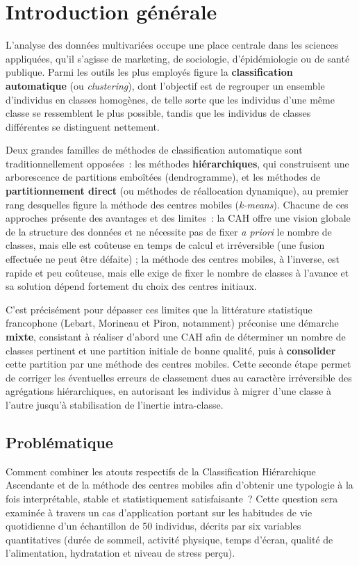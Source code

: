 \documentclass[11pt,a4paper,oneside]{book}
\begin{document}
\mainmatter

\chapter{Introduction générale}

L'analyse des données multivariées occupe une place centrale dans les sciences appliquées, qu'il s'agisse de marketing, de sociologie, d'épidémiologie ou de santé publique. Parmi les outils les plus employés figure la \textbf{classification automatique} (ou \emph{clustering}), dont l'objectif est de regrouper un ensemble d'individus en classes homogènes, de telle sorte que les individus d'une même classe se ressemblent le plus possible, tandis que les individus de classes différentes se distinguent nettement.

Deux grandes familles de méthodes de classification automatique sont traditionnellement opposées~: les méthodes \textbf{hiérarchiques}, qui construisent une arborescence de partitions emboîtées (dendrogramme), et les méthodes de \textbf{partitionnement direct} (ou méthodes de réallocation dynamique), au premier rang desquelles figure la méthode des centres mobiles (\emph{k-means}). Chacune de ces approches présente des avantages et des limites~: la CAH offre une vision globale de la structure des données et ne nécessite pas de fixer \emph{a priori} le nombre de classes, mais elle est coûteuse en temps de calcul et irréversible (une fusion effectuée ne peut être défaite) ; la méthode des centres mobiles, à l'inverse, est rapide et peu coûteuse, mais elle exige de fixer le nombre de classes à l'avance et sa solution dépend fortement du choix des centres initiaux.

C'est précisément pour dépasser ces limites que la littérature statistique francophone (Lebart, Morineau et Piron, notamment) préconise une démarche \textbf{mixte}, consistant à réaliser d'abord une CAH afin de déterminer un nombre de classes pertinent et une partition initiale de bonne qualité, puis à \textbf{consolider} cette partition par une méthode des centres mobiles. Cette seconde étape permet de corriger les éventuelles erreurs de classement dues au caractère irréversible des agrégations hiérarchiques, en autorisant les individus à migrer d'une classe à l'autre jusqu'à stabilisation de l'inertie intra-classe.

\section*{Problématique}
Comment combiner les atouts respectifs de la Classification Hiérarchique Ascendante et de la méthode des centres mobiles afin d'obtenir une typologie à la fois interprétable, stable et statistiquement satisfaisante~? Cette question sera examinée à travers un cas d'application portant sur les habitudes de vie quotidienne d'un échantillon de 50 individus, décrits par six variables quantitatives (durée de sommeil, activité physique, temps d'écran, qualité de l'alimentation, hydratation et niveau de stress perçu).
\end{document}
